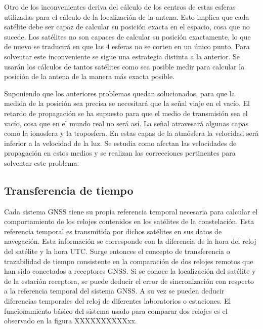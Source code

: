 Otro de los inconvenientes deriva del cálculo de los centros de estas esferas utilizadas para el cálculo de la localización de la antena. Esto implica que cada satélite debe ser capaz de calcular su posición exacta en el espacio, cosa que no sucede. Los satélites no son capaces de calcular su posición exactamente, lo que de nuevo se traducirá en que las 4 esferas no se corten en un único punto. Para solventar este inconveniente se sigue una estrategia distinta a la anterior. Se usarán los cálculos de tantos satélites como sea posible medir para calcular la posición de la antena de la manera más exacta posible. \newline

Suponiendo que los anteriores problemas quedan solucionados, para que la medida de la posición sea precisa se necesitará que la señal viaje en el vacío. El retardo de propagación se ha supuesto para que el medio de transmisión sea el vacío, cosa que en el mundo real no será así. La señal atravesará algunas capas como la ionosfera y la troposfera. En estas capas de la atmósfera la velocidad será inferior a la velocidad de la luz. Se estudia como afectan las velocidades de propagación en estos medios y se realizan las correcciones pertinentes para solventar este problema. \newline


\subsection{Transferencia de tiempo}

Cada sistema GNSS tiene su propia referencia temporal necesaria para calcular el comportamiento de los relojes contenidos en los satélites de la constelación. Esta referencia temporal es transmitida por dichos satélites en sus datos de navegación. Esta información se corresponde con la diferencia de la hora del reloj del satélite y la hora UTC. Surge entonces el concepto de transferencia o trazabilidad de tiempo consistente en la comparación de dos relojes remotos que han sido conectados a receptores GNSS. Si se conoce la localización del satélite y de la estación receptora, se puede deducir el error de sincronización con respecto a la referencia temporal del sistema GNSS. A su vez se pueden deducir diferencias temporales del reloj de diferentes laboratorios o estaciones. El funcionamiento básico del sistema usado para comparar dos relojes es el observado en la figura XXXXXXXXXXxx.\newline

